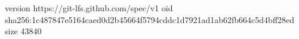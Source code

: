 version https://git-lfs.github.com/spec/v1
oid sha256:1c487847e5164caed0d2b45664f5794cddc1d7921ad1ab62fb664c5d4bff28ed
size 43840

